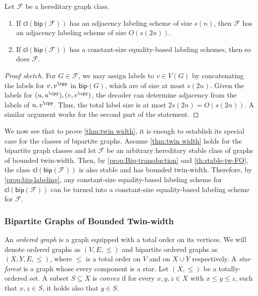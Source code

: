 \documentclass{article}
\newcommand{\cF}{\ensuremath{\mathcal{F}}}
\newcommand{\bip}{\mathsf{bip}}
\newcommand{\cl}{\mathsf{cl}}
\begin{document}
\begin{proposition}
\label{prop:bip-labeling}
Let $\cF$ be a hereditary graph class. 
\begin{enumerate}
	\item[(1)] If $\cl(\bip(\cF))$ has an adjacency labeling scheme of
	size $s(n)$, then $\cF$ has an adjacency labeling scheme of size $O(s(2n))$. 
	\item[(2)] If $\cl(\bip(\cF))$ has a constant-size equality-based labeling schemes, then so does $\cF$.
\end{enumerate}
\end{proposition}
\begin{proof}[Proof sketch]
For $G \in \cF$, we may assign labels to $v \in V(G)$ by concatenating the labels for $v, v^\cpy$
in $\bip(G)$, which are of size at most $s(2n)$. Given the labels for $(u, u^\cpy), (v, v^\cpy)$,
the decoder can determine adjacency from the labels of $u, v^\cpy$. 
Thus, the total label size is at most $2s(2n) = O(s(2n))$.
A similar argument works for the second part of the statement.
\end{proof}

We now see that to prove \cref{thm:twin width}, it is enough to establish its special case for the classes of
bipartite graphs.  Assume \cref{thm:twin width} holds for the bipartite graph classes and let $\cF$ be
an arbitrary hereditary stable class of graphs of bounded twin-width.  Then, by
\cref{prop:Bip-transduction} and \cref{th:stable-tw-FO}, the class $\cl(\bip(\cF))$ is also stable
and has bounded twin-width.  Therefore, by \cref{prop:bip-labeling}, any constant-size equality-based
labeling scheme for $\cl(\bip(\cF))$ can be turned into a constant-size equality-based labeling
scheme for $\cF$.



\subsubsection{Bipartite Graphs of Bounded Twin-width}\label{sec:bip-graphs}

An \emph{ordered graph} is a graph equipped with a total order on its vertices. We will denote
ordered graphs as $(V,E,\leq)$ and bipartite ordered graphs  as $ (X,Y,E,\leq)$, where $\leq$ 
is a total order on $V$ and on $X \cup Y$ respectively.
A \emph{star forest} is a graph whose every component is a star.
Let $(X,\leq)$ be a totally-ordered set. A subset $S \subseteq X$ is
\emph{convex} if for every $x,y,z\in X$ with $x \leq y \leq z$, such that $x,z \in S$, it holds also that $y \in S$.
\end{document}
